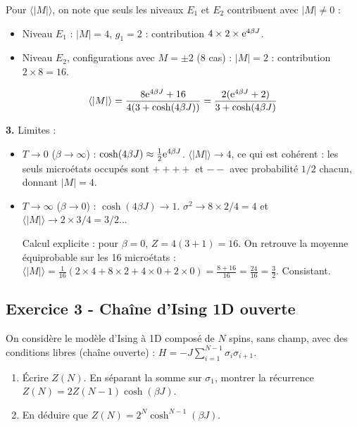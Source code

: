 \documentclass[12pt,a4paper]{article}
\begin{document}
\begin{boitecorrige}
Pour $\langle|M|\rangle$, on note que seuls les niveaux $E_1$ et $E_2$ contribuent avec $|M|\neq0$ :
\begin{itemize}
  \item Niveau $E_1$ : $|M|=4$, $g_1=2$ : contribution $4\times2\times\mathrm{e}^{4\beta J}$.
  \item Niveau $E_2$, configurations avec $M=\pm2$ (8 cas) : $|M|=2$ : contribution $2\times8 = 16$.
\end{itemize}
\[
\langle|M|\rangle = \frac{8\mathrm{e}^{4\beta J} + 16}{4(3+\cosh(4\beta J))} = \frac{2(\mathrm{e}^{4\beta J}+2)}{3+\cosh(4\beta J)}
\]

\textbf{3.} Limites :
\begin{itemize}
  \item $T\to0$ ($\beta\to\infty$) : $\cosh(4\beta J)\approx\frac{1}{2}\mathrm{e}^{4\beta J}$. $\langle|M|\rangle\to4$, ce qui est cohérent : les seuls microétats occupés sont $++++$ et $--$ avec probabilité $1/2$ chacun, donnant $|M|=4$.
  \item $T\to\infty$ ($\beta\to0$) : $\cosh(4\beta J)\to1$. $\sigma^2\to8\times2/4 = 4$ et $\langle|M|\rangle\to2\times3/4 = 3/2$...

Calcul explicite : pour $\beta=0$, $Z = 4(3+1)=16$. On retrouve la moyenne équiprobable sur les 16 microétats : $\langle|M|\rangle = \frac{1}{16}(2\times4 + 8\times2 + 4\times0 + 2\times0) = \frac{8+16}{16} = \frac{24}{16} = \frac{3}{2}$. Consistant.
\end{itemize}
\end{boitecorrige}

\subsection*{Exercice 3 - Chaîne d'Ising 1D ouverte \niveau{\moyen}}

\begin{boiteexercice}
On considère le modèle d'Ising à 1D composé de $N$ spins, sans champ, avec des conditions libres (chaîne ouverte) : $H = -J\sum_{i=1}^{N-1}\sigma_i\sigma_{i+1}$.

\begin{enumerate}
  \item Écrire $Z(N)$. En séparant la somme sur $\sigma_1$, montrer la récurrence $Z(N) = 2Z(N-1)\cosh(\beta J)$.
  \item En déduire que $Z(N) = 2^N\cosh^{N-1}(\beta J)$.
\end{enumerate}
\end{boiteexercice}
\end{document}
